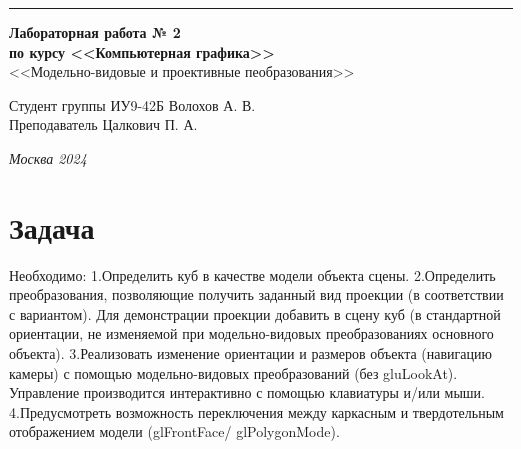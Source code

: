 \documentclass[a4paper, 14pt]{extarticle}
\begin{document}
\begin{titlepage}
\vspace*{-16pt}
\hspace{30pt}\rule{0.866\textwidth}{0.4pt}
  
\vspace{11em}

\begin{center}
\Large {\bf Лабораторная работа № 2} \\
\large {\bf по курсу <<Компьютерная графика>>} \\
\large <<Модельно-видовые и проективные пеобразования>>
\end{center}\normalsize

\vspace{8em}


\begin{flushright}
  {Студент группы ИУ9-42Б Волохов А. В.\hspace*{15pt} \\
  \vspace{2ex}
  Преподаватель Цалкович П. А.\hspace*{15pt}}
\end{flushright}

\bigskip

\vfill


\begin{center}
\textsl{Москва 2024}
\end{center}
\end{titlepage}

\renewcommand{\ttdefault}{pcr}

\setlength{\tabcolsep}{3pt}
\newpage
\setcounter{page}{2}

\section{Задача}\label{Sect::task}
\par
Необходимо:
\newline
1.Определить куб в качестве модели объекта сцены.
\newline
2.Определить преобразования, позволяющие получить заданный вид проекции (в
соответствии с вариантом). Для демонстрации проекции добавить в сцену куб (в стандартной
ориентации, не изменяемой при модельно-видовых преобразованиях основного объекта).
\newline
3.Реализовать изменение ориентации и размеров объекта (навигацию камеры) с помощью
модельно-видовых преобразований (без gluLookAt). Управление производится интерактивно с
помощью клавиатуры и/или мыши.
\newline
4.Предусмотреть возможность переключения между каркасным и твердотельным
отображением модели (glFrontFace/ glPolygonMode).
\end{document}
